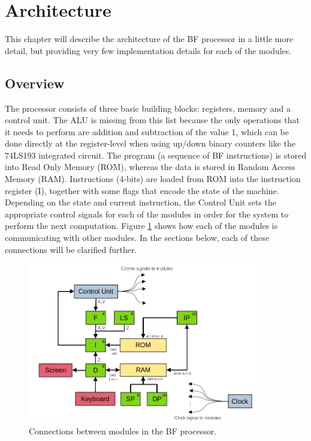 \section{Architecture}
This chapter will describe the architecture of the BF processor in a little more detail, but providing very few implementation details for each of the modules.

\subsection{Overview}
The processor consists of three basic building blocks: registers, memory and a control unit. The ALU is missing from this list because the only operations that it needs to perform are addition and subtraction of the value 1, which can be done directly at the register-level when using up/down binary counters like the 74LS193 integrated circuit. The program (a sequence of BF instructions) is stored into Read Only Memory (ROM), whereas the data is stored in Random Access Memory (RAM). Instructions (4-bits) are loaded from ROM into the instruction register (I), together with some flags that encode the state of the machine. Depending on the state and current instruction, the Control Unit sets the appropriate control signals for each of the modules in order for the system to perform the next computation. Figure \ref{fig:architecture} shows how each of the modules is communicating with other modules. In the sections below, each of these connections will be clarified further.

\begin{figure}[H]
  \centering
  \includegraphics[width=0.9\textwidth]{img/bfcpu_architecture}
  \caption{Connections between modules in the BF processor.}
  \label{fig:architecture}
\end{figure}

